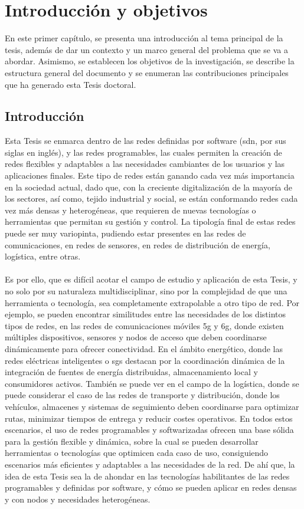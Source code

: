 \chapter{Introducción y objetivos}

En este primer capítulo, se presenta una introducción al tema principal de la tesis, además de dar un contexto y un marco general del problema que se va a abordar. Asimismo, se establecen los objetivos de la investigación, se describe la estructura general del documento y se enumeran las contribuciones principales que ha generado esta Tesis doctoral.

\section{Introducción}

Esta Tesis se enmarca dentro de las redes definidas por software (\gls{sdn}, por sus siglas en inglés), y las redes programables, las cuales permiten la creación de redes flexibles y adaptables a las necesidades cambiantes de los usuarios y las aplicaciones finales. Este tipo de redes están ganando cada vez más importancia en la sociedad actual, dado que, con la creciente digitalización de la mayoría de los sectores, así como, tejido industrial y social, se están conformando redes cada vez más densas y heterogéneas, que requieren de nuevas tecnologías o herramientas que permitan su gestión y control. La tipología final de estas redes puede ser muy variopinta, pudiendo estar presentes en las redes de comunicaciones, en redes de sensores, en redes de distribución de energía, logística, entre otras.\\
\\
Es por ello, que es difícil acotar el campo de estudio y aplicación de esta Tesis, y no solo por su naturaleza multidisciplinar, sino por la complejidad de que una herramienta o tecnología, sea completamente extrapolable a otro tipo de red. Por ejemplo, se pueden encontrar similitudes entre las necesidades de los distintos tipos de redes, en las redes de comunicaciones móviles \gls{5g} y \gls{6g}, donde existen múltiples dispositivos, sensores y nodos de acceso que deben coordinarse dinámicamente para ofrecer conectividad. En el ámbito energético, donde las redes eléctricas inteligentes o \glspl{sg} destacan por la coordinación dinámica de la integración de fuentes de energía distribuidas, almacenamiento local y consumidores activos. También se puede ver en el campo de la logística, donde se puede considerar el caso de las redes de transporte y distribución, donde los vehículos, almacenes y sistemas de seguimiento deben coordinarse para optimizar rutas, minimizar tiempos de entrega y reducir costes operativos. En todos estos escenarios, el uso de redes programables y softwarizadas ofrecen una base sólida para la gestión flexible y dinámica, sobre la cual se pueden desarrollar herramientas o tecnologías que optimicen cada caso de uso, consiguiendo escenarios más eficientes y adaptables a las necesidades de la red. De ahí que, la idea de esta Tesis sea la de ahondar en las tecnologías habilitantes de las redes programables y definidas por software, y cómo se pueden aplicar en redes densas y con nodos y necesidades heterogéneas. 

